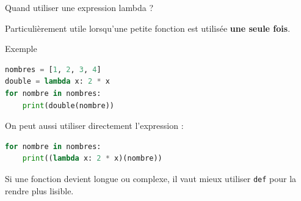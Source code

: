 \documentclass[10pt, xcolor={svgnames}]{beamer}
\begin{document}
\begin{frame}[fragile]{Quand utiliser une expression  lambda ?}
	
	\vspace{0.3cm}
	Particulièrement utile lorsqu'une petite
	fonction est utilisée \textbf{une seule fois}.
	
	\vspace{0.4cm}
	
	\begin{exampleblock}{Exemple}
		\begin{lstlisting}[language=Python]
nombres = [1, 2, 3, 4]
double = lambda x: 2 * x
for nombre in nombres:
	print(double(nombre))
		\end{lstlisting}
	\end{exampleblock}
	
	\vspace{0.3cm}
	
	On peut aussi utiliser directement l'expression :
	
	\begin{exampleblock}{}
		\begin{lstlisting}[language=Python]
for nombre in nombres:
	print((lambda x: 2 * x)(nombre))
		\end{lstlisting}
	\end{exampleblock}
	

		Si une fonction devient longue ou complexe, il vaut mieux utiliser
		\texttt{def} pour la rendre plus lisible.

	
\end{frame}
\end{document}
